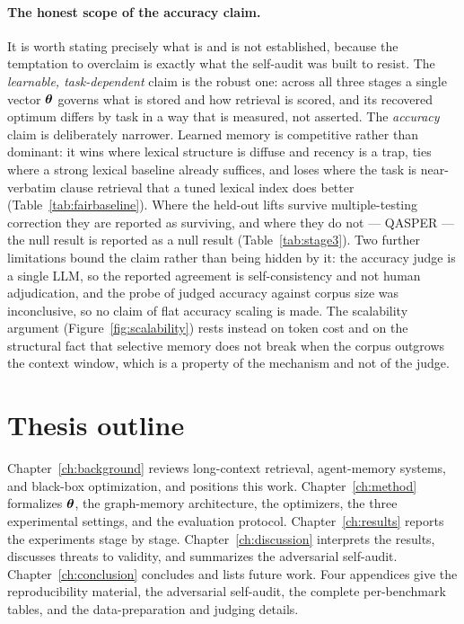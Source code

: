\paragraph{The honest scope of the accuracy claim.} It is worth stating precisely
what is and is not established, because the temptation to overclaim is exactly
what the self-audit was built to resist. The \emph{learnable, task-dependent}
claim is the robust one: across all three stages a single vector $\boldsymbol{\theta}$
governs what is stored and how retrieval is scored, and its recovered optimum
differs by task in a way that is measured, not asserted. The \emph{accuracy}
claim is deliberately narrower. Learned memory is competitive rather than
dominant: it wins where lexical structure is diffuse and recency is a trap, ties
where a strong lexical baseline already suffices, and loses where the task is
near-verbatim clause retrieval that a tuned lexical index does better
(Table~\ref{tab:fairbaseline}). Where the held-out lifts survive multiple-testing
correction they are reported as surviving, and where they do not --- QASPER --- the
null result is reported as a null result (Table~\ref{tab:stage3}). Two further
limitations bound the claim rather than being hidden by it: the accuracy judge is
a single LLM, so the reported agreement is self-consistency and not human
adjudication, and the probe of judged accuracy against corpus size was
inconclusive, so no claim of flat accuracy scaling is made. The scalability
argument (Figure~\ref{fig:scalability}) rests instead on token cost and on the
structural fact that selective memory does not break when the corpus outgrows the
context window, which is a property of the mechanism and not of the judge.

\section{Thesis outline}
Chapter~\ref{ch:background} reviews long-context retrieval, agent-memory
systems, and black-box optimization, and positions this work. Chapter~\ref{ch:method}
formalizes $\boldsymbol{\theta}$, the graph-memory architecture, the optimizers, the three
experimental settings, and the evaluation protocol. Chapter~\ref{ch:results}
reports the experiments stage by stage. Chapter~\ref{ch:discussion} interprets
the results, discusses threats to validity, and summarizes the adversarial
self-audit. Chapter~\ref{ch:conclusion} concludes and lists future work. Four
appendices give the reproducibility material, the adversarial self-audit, the
complete per-benchmark tables, and the data-preparation and judging details.
